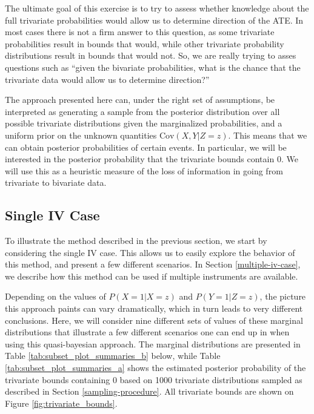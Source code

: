 \documentclass[
]{article}
\theoremstyle{plain}
\begin{document}
The ultimate goal of this exercise is to try to assess whether knowledge about the full trivariate probabilities would allow us to determine direction of the ATE. In most cases there is not a firm answer to this question, as some trivariate probabilities result in bounds that would, while other trivariate probability distributions result in bounds that would not. So, we are really trying to asses questions such as ``given the bivariate probabilities, what is the chance that the trivariate data would allow us to determine direction?''

The approach presented here can, under the right set of assumptions, be interpreted as generating a sample from the posterior distribution over all possible trivariate distributions given the marginalized probabilities, and a uniform prior on the unknown quantities \(\text{Cov}(X, Y | Z = z)\). This means that we can obtain posterior probabilities of certain events. In particular, we will be interested in the posterior probability that the trivariate bounds contain \(0\). We will use this as a heuristic measure of the loss of information in going from trivariate to bivariate data.

\hypertarget{single-iv-case}{%
\subsection{Single IV Case}\label{single-iv-case}}

To illustrate the method described in the previous section, we start by considering the single IV case. This allows us to easily explore the behavior of this method, and present a few different scenarios. In Section \ref{multiple-iv-case}, we describe how this method can be used if multiple instruments are available.

Depending on the values of \(P(X = 1 | X = z)\) and \(P(Y = 1 | Z = z)\), the picture this approach paints can vary dramatically, which in turn leads to very different conclusions. Here, we will consider nine different sets of values of these marginal distributions that illustrate a few different scenarios one can end up in when using this quasi-bayesian approach. The marginal distributions are presented in Table \ref{tab:subset_plot_summaries_b} below, while Table \ref{tab:subset_plot_summaries_a} shows the estimated posterior probability of the trivariate bounds containing \(0\) based on 1000 trivariate distributions sampled as described in Section \ref{sampling-procedure}. All trivariate bounds are shown on Figure \ref{fig:trivariate_bounds}.
\end{document}
